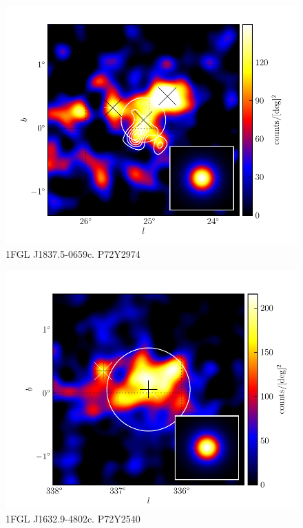 \documentclass[12pt,preprint]{aastex}
\begin{document}
\begin{figure}
  \begin{center}
    \includegraphics[type=pdf,ext=.pdf,read=.pdf]{source_plots/source_1FGL_J1837.5-0659c}
  \end{center}
  \caption{1FGL J1837.5-0659c. P72Y2974
  }\label{1FGL_J1837.5-0659c}
\end{figure}


\begin{figure}
  \begin{center}
    \includegraphics[type=pdf,ext=.pdf,read=.pdf]{source_plots/source_1FGL_J1632.9-4802c}
  \end{center}
  \caption{1FGL J1632.9-4802c. P72Y2540
  }\label{1FGL_J1632.9-4802c}
\end{figure}
\end{document}
